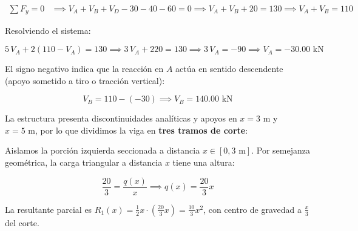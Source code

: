 \begin{enumerate}
\begin{align}
              \sum F_y = 0 & \implies V_A + V_B + V_D - 30 - 40 - 60 = 0 \implies V_A + V_B + 20 = 130 \implies V_A + V_B = 110

          \end{align}

          Resolviendo el sistema:

          \begin{equation}

              5\,V_A + 2(110 - V_A) = 130 \implies 3\,V_A + 220 = 130 \implies 3\,V_A = -90 \implies \boxed{V_A = -30.00\text{ kN}}

          \end{equation}

          El signo negativo indica que la reacción en $A$ actúa en sentido descendente (apoyo sometido a tiro o tracción vertical):

          \begin{equation}

              V_B = 110 - (-30) \implies \boxed{V_B = 140.00\text{ kN}}

          \end{equation}

\end{enumerate}






La estructura presenta discontinuidades analíticas y apoyos en $x = 3\text{ m}$ y $x = 5\text{ m}$, por lo que dividimos la viga en \textbf{tres tramos de corte}:






Aislamos la porción izquierda seccionada a distancia $x \in [0, 3\text{ m}]$. Por semejanza geométrica, la carga triangular a distancia $x$ tiene una altura:

\begin{equation}

    \frac{20}{3} = \frac{q(x)}{x} \implies q(x) = \frac{20}{3}x

\end{equation}

La resultante parcial es $R_1(x) = \frac{1}{2} x \cdot \left(\frac{20}{3}x\right) = \frac{10}{3}x^2$, con centro de gravedad a $\frac{x}{3}$ del corte.



